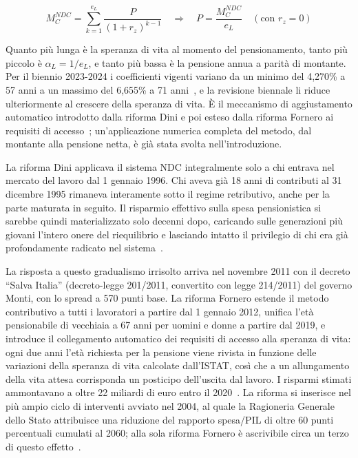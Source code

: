 \[
M_C^{NDC} = \sum_{k=1}^{e_L} \frac{P}{(1+r_z)^{k-1}}
\quad \Longrightarrow \quad
P = \frac{M_C^{NDC}}{e_L}
\quad (\text{con } r_z = 0)
\]

Quanto più lunga è la speranza di vita al momento del pensionamento, tanto più piccolo è \(\alpha_L = 1/e_L\), e tanto più bassa è la pensione annua a parità di montante. Per il biennio 2023-2024 i coefficienti vigenti variano da un minimo del 4,270\% a 57 anni a un massimo del 6,655\% a 71 anni~\cite{RosenGayerRapallini2023}, e la revisione biennale li riduce ulteriormente al crescere della speranza di vita. È il meccanismo di aggiustamento automatico introdotto dalla riforma Dini e poi esteso dalla riforma Fornero ai requisiti di accesso~\cite{Bosi2018}; un'applicazione numerica completa del metodo, dal montante alla pensione netta, è già stata svolta nell'introduzione.

La riforma Dini applicava il sistema NDC integralmente solo a chi entrava nel mercato del lavoro dal 1 gennaio 1996. Chi aveva già 18 anni di contributi al 31 dicembre 1995 rimaneva interamente sotto il regime retributivo, anche per la parte maturata in seguito. Il risparmio effettivo sulla spesa pensionistica si sarebbe quindi materializzato solo decenni dopo, caricando sulle generazioni più giovani l'intero onere del riequilibrio e lasciando intatto il privilegio di chi era già profondamente radicato nel sistema~\cite{LavoceRiformaDini, Bosi2018}.

La risposta a questo gradualismo irrisolto arriva nel novembre 2011 con il decreto ``Salva Italia'' (decreto-legge 201/2011, convertito con legge 214/2011) del governo Monti, con lo spread a 570 punti base. La riforma Fornero estende il metodo contributivo a tutti i lavoratori a partire dal 1 gennaio 2012, unifica l'età pensionabile di vecchiaia a 67 anni per uomini e donne a partire dal 2019, e introduce il collegamento automatico dei requisiti di accesso alla speranza di vita: ogni due anni l'età richiesta per la pensione viene rivista in funzione delle variazioni della speranza di vita calcolate dall'ISTAT, così che a un allungamento della vita attesa corrisponda un posticipo dell'uscita dal lavoro. I risparmi stimati ammontavano a oltre 22 miliardi di euro entro il 2020~\cite{RepubblicaFornero2012}. La riforma si inserisce nel più ampio ciclo di interventi avviato nel 2004, al quale la Ragioneria Generale dello Stato attribuisce una riduzione del rapporto spesa/PIL di oltre 60 punti percentuali cumulati al 2060; alla sola riforma Fornero è ascrivibile circa un terzo di questo effetto~\cite{MEF_RGS2025_NdA, BosiGuerra2022}.

